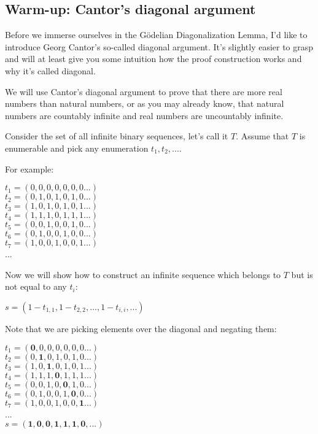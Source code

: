 \documentclass{article}
\begin{document}
\subsection{Warm-up: Cantor's diagonal argument}

Before we immerse ourselves in the Gödelian Diagonalization Lemma,
I'd like to introduce Georg Cantor's so-called diagonal argument.
It's slightly easier to grasp and will at least give you some intuition how
the proof construction works and why it's called diagonal.

We will use Cantor's diagonal argument to prove that there are more real
numbers than natural numbers, or as you may already know, that
natural numbers are countably infinite and real numbers are uncountably
infinite.

Consider the set of all infinite binary sequences, let's call it $T$.
Assume that $T$ is enumerable and pick any enumeration $t_1, t_2, ...$.

For example:

\begin{center}
    $t_1 = (0, 0, 0, 0, 0, 0, 0...)$\\
    $t_2 = (0, 1, 0, 1, 0, 1, 0 ...)$\\
    $t_3 = (1, 0, 1, 0, 1, 0, 1 ...)$\\
    $t_4 = (1, 1, 1, 0, 1, 1, 1 ...)$\\
    $t_5 = (0, 0, 1, 0, 0, 1, 0 ...)$\\
    $t_6 = (0, 1, 0, 0, 1, 0, 0 ...)$\\
    $t_7 = (1, 0, 0, 1, 0, 0, 1 ...)$\\
    ...\\
\end{center}

Now we will show how to construct an infinite sequence which belongs to
$T$ but is not equal to any $t_i$:

\begin{center}
    $s = (1-t_{1,1}, 1-t_{2,2}, ..., 1-t_{i,i}, ...)$
\end{center}

Note that we are picking elements over the diagonal and negating them:

\begin{center}
    $t_1 = (\mathbf{0}, 0, 0, 0, 0, 0, 0...)$\\
    $t_2 = (0, \mathbf{1}, 0, 1, 0, 1, 0 ...)$\\
    $t_3 = (1, 0, \mathbf{1}, 0, 1, 0, 1 ...)$\\
    $t_4 = (1, 1, 1, \mathbf{0}, 1, 1, 1 ...)$\\
    $t_5 = (0, 0, 1, 0, \mathbf{0}, 1, 0 ...)$\\
    $t_6 = (0, 1, 0, 0, 1, \mathbf{0}, 0 ...)$\\
    $t_7 = (1, 0, 0, 1, 0, 0, \mathbf{1} ...)$\\
    ...\\
    $s = (\mathbf{1}, \mathbf{0}, \mathbf{0}, \mathbf{1}, \mathbf{1}, \mathbf{1}, \mathbf{0}, ...)$
\end{center}
\end{document}
